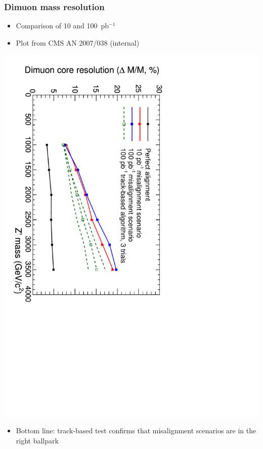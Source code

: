 \documentclass[compress]{beamer}
\begin{document}
\begin{frame}
\frametitle{Dimuon mass resolution}

\begin{itemize}
\item Comparison of 10 and 100~pb$^{-1}$

\item Plot from {\small CMS AN 2007/038} (internal)
\end{itemize}

\vspace{-0.5 cm}
\begin{center}
\includegraphics[height=0.9\linewidth, angle=90]{ZSSM_Align10-100_MassRes_color.pdf}
\end{center}

\vspace{-0.5 cm}
\begin{itemize}
\item Bottom line: track-based test confirms that misalignment
scenarios are in the right ballpark
\end{itemize}
\end{frame}
\end{document}
